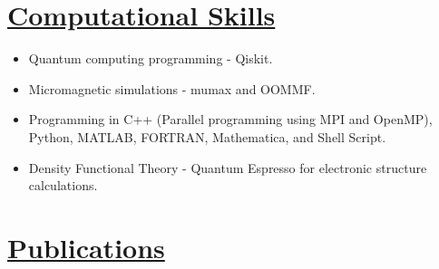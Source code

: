 \documentclass[12pt]{article}
\begin{document}
\section*{\underline{Computational Skills}} 
\begin{itemize}
\itemsep-0.1em
\item Quantum computing programming - Qiskit.
\item Micromagnetic simulations - mumax and OOMMF.
\item Programming in C++ (Parallel programming using MPI and OpenMP), Python, MATLAB, FORTRAN, Mathematica, and Shell Script. 
\item Density Functional Theory - Quantum Espresso for electronic structure calculations.
\end{itemize}

\section*{\underline{Publications}}
\end{document}
